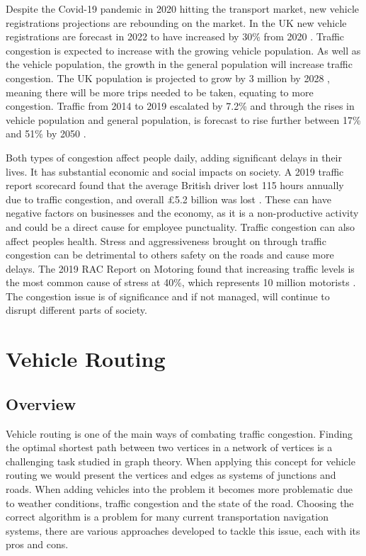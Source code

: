 \documentclass[11pt]{report}
\begin{document}
Despite the Covid-19 pandemic in 2020 hitting the transport market, new vehicle registrations projections are rebounding on the market. In the UK new vehicle registrations are forecast in 2022 to have increased by 30\%  from 2020 \autocite{smmtnewCars}. Traffic congestion is expected to increase with the growing vehicle population. As well as the vehicle population, the growth in the general population will increase traffic congestion. The UK population is projected to grow by 3 million by 2028 \autocite{nashnational}, meaning there will be more trips needed to be taken, equating to more congestion. Traffic from 2014 to 2019 escalated by 7.2\% \autocite{dotRoadEstimates} and through the rises in vehicle population and general population, is forecast to rise further between 17\% and 51\% by 2050 \autocite{roadtrafficforecasts}.

Both types of congestion affect people daily, adding significant delays in their lives. It has substantial economic and social impacts on society. A 2019 traffic report scorecard found that the average British driver lost 115 hours annually due to traffic congestion, and overall £5.2 billion was lost \autocite{reed2019inrix}. These can have negative factors on businesses and the economy, as it is a non-productive activity and could be a direct cause for employee punctuality. Traffic congestion can also affect peoples health. Stress and aggressiveness brought on through traffic congestion can be detrimental to others safety on the roads and cause more delays. The 2019 RAC Report on Motoring found that increasing traffic levels is the most common cause of stress at 40\%, which represents 10 million motorists \autocite{racreportonmotoring}. The congestion issue is of significance and if not managed, will continue to disrupt different parts of society. 

\section{Vehicle Routing}

\subsection{Overview}

Vehicle routing is one of the main ways of combating traffic congestion. Finding the optimal shortest path between two vertices in a network of vertices is a challenging task studied in graph theory. When applying this concept for vehicle routing we would present the vertices and edges as systems of junctions and roads. When adding vehicles into the problem it becomes more problematic due to weather conditions, traffic congestion and the state of the road. Choosing the correct algorithm is a problem for many current transportation navigation systems, there are various approaches developed to tackle this issue, each with its pros and cons.
\end{document}
